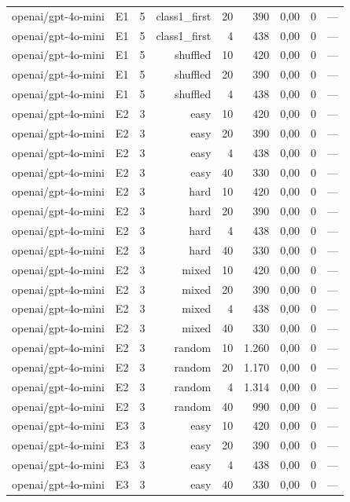 \begin{table}[htbp]
\begin{tabular}{lllrrrrrr}
openai/gpt-4o-mini & E1 & 5 & class1\_first & 20 & 390 & 0,00 & 0 & — \\
openai/gpt-4o-mini & E1 & 5 & class1\_first & 4 & 438 & 0,00 & 0 & — \\
openai/gpt-4o-mini & E1 & 5 & shuffled & 10 & 420 & 0,00 & 0 & — \\
openai/gpt-4o-mini & E1 & 5 & shuffled & 20 & 390 & 0,00 & 0 & — \\
openai/gpt-4o-mini & E1 & 5 & shuffled & 4 & 438 & 0,00 & 0 & — \\
openai/gpt-4o-mini & E2 & 3 & easy & 10 & 420 & 0,00 & 0 & — \\
openai/gpt-4o-mini & E2 & 3 & easy & 20 & 390 & 0,00 & 0 & — \\
openai/gpt-4o-mini & E2 & 3 & easy & 4 & 438 & 0,00 & 0 & — \\
openai/gpt-4o-mini & E2 & 3 & easy & 40 & 330 & 0,00 & 0 & — \\
openai/gpt-4o-mini & E2 & 3 & hard & 10 & 420 & 0,00 & 0 & — \\
openai/gpt-4o-mini & E2 & 3 & hard & 20 & 390 & 0,00 & 0 & — \\
openai/gpt-4o-mini & E2 & 3 & hard & 4 & 438 & 0,00 & 0 & — \\
openai/gpt-4o-mini & E2 & 3 & hard & 40 & 330 & 0,00 & 0 & — \\
openai/gpt-4o-mini & E2 & 3 & mixed & 10 & 420 & 0,00 & 0 & — \\
openai/gpt-4o-mini & E2 & 3 & mixed & 20 & 390 & 0,00 & 0 & — \\
openai/gpt-4o-mini & E2 & 3 & mixed & 4 & 438 & 0,00 & 0 & — \\
openai/gpt-4o-mini & E2 & 3 & mixed & 40 & 330 & 0,00 & 0 & — \\
openai/gpt-4o-mini & E2 & 3 & random & 10 & 1.260 & 0,00 & 0 & — \\
openai/gpt-4o-mini & E2 & 3 & random & 20 & 1.170 & 0,00 & 0 & — \\
openai/gpt-4o-mini & E2 & 3 & random & 4 & 1.314 & 0,00 & 0 & — \\
openai/gpt-4o-mini & E2 & 3 & random & 40 & 990 & 0,00 & 0 & — \\
openai/gpt-4o-mini & E3 & 3 & easy & 10 & 420 & 0,00 & 0 & — \\
openai/gpt-4o-mini & E3 & 3 & easy & 20 & 390 & 0,00 & 0 & — \\
openai/gpt-4o-mini & E3 & 3 & easy & 4 & 438 & 0,00 & 0 & — \\
openai/gpt-4o-mini & E3 & 3 & easy & 40 & 330 & 0,00 & 0 & — \\

\end{tabular}
\end{table}
